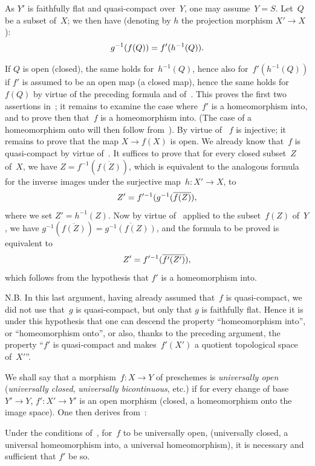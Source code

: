 As $Y'$ is faithfully flat and quasi-compact over~$Y$, one may
assume~$Y=S$. Let~$Q$
be a subset of~$X$; we then have (denoting by $h$ the projection
morphism $X'\to X$):
$$
g^{-1}(f(Q))=f'(h^{-1}(Q)).
$$

If $Q$ is open (\resp closed), the same holds for~$h^{-1}(Q)$, hence
also for~$f'(h^{-1}(Q))$ if $f'$ is assumed to be an open map
(\resp a closed map), hence the same holds for~$f(Q)$ by virtue of the
preceding formula and of~. This proves the first two
assertions in~; it remains to examine the case
where~$f'$ is a homeomorphism into, and to prove then that~$f$ is a
homeomorphism into. (The case of a homeomorphism onto will then
follow from~). By virtue of~
$f$ is injective; it remains to prove that the map $X\to f(X)$ is
open. We already know that~$f$ is quasi-compact by virtue
of~. It suffices to prove that for every closed
subset~$Z$ of~$X$, we have $Z=f^{-1}(\overline{f(Z)})$, which is
equivalent to the analogous formula for the inverse images under the
surjective map~$h\colon X'\to X$, \ie to
$$
Z'=f'^{-1}(g^{-1}(\overline{f(Z)}),
$$
where we set $Z'=h^{-1}(Z)$. Now by virtue of~ applied
to the subset~$f(Z)$ of~$Y$, we have
$g^{-1}(\overline{f(Z)})=\overline{g^{-1}(f(Z))}$, and the formula to
be proved is equivalent to
$$
Z'=f'^{-1}(\overline{f'(Z')}),
$$
which follows from the hypothesis that $f'$ is a homeomorphism
into.

N.B. In this last argument, having already assumed that~$f$ is
quasi-compact, we did not use that~$g$ is quasi-compact, but only
that
$g$
is faithfully flat. Hence it is under this hypothesis that one can
descend the property ``homeomorphism into'', or ``homeomorphism
onto'', or also, thanks to the preceding argument, the property
``$f'$ is quasi-compact and makes~$f'(X')$ a quotient topological
space of~$X'$''.

We shall say that a morphism~$f\colon X\to Y$ of preschemes is
\emph{universally open} (\resp \emph{universally closed},
\resp \emph{universally bicontinuous}, etc.)
if for every change of base~$Y'\to Y$, $f'\colon X'\to Y'$ is an open
morphism (\resp closed, \resp a
homeomorphism
onto the image space). One then derives from~:

\begin{corollary}
\label{VIII.4.7}
Under
the conditions of~, for~$f$ to be universally open,
(\resp universally closed, \resp a universal homeomorphism into,
\resp a universal homeomorphism), it is necessary and sufficient
that $f'$ be so.
\end{corollary}

